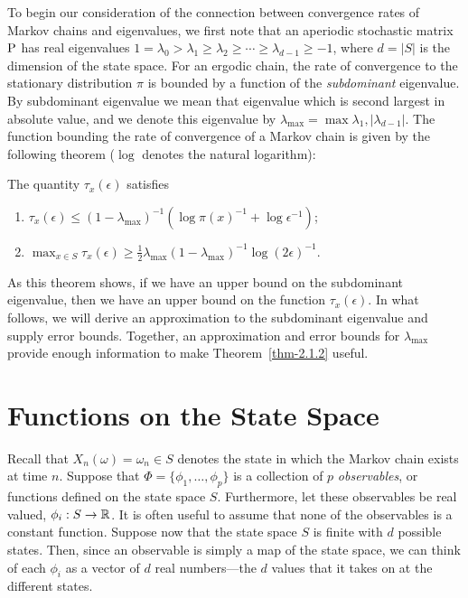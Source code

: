 To begin our consideration of the connection between convergence rates of Markov
chains and eigenvalues, we first note that an aperiodic stochastic matrix $\P$ has real
eigenvalues 
$1 = \lambda_0 > \lambda_1 \geq \lambda_2 \geq \cdots \geq \lambda_{d-1} \geq -1$, 
where $d = |S|$ is the dimension of the state space. For an ergodic chain, the
rate of convergence to the stationary distribution $\pi$ is bounded by a
function of the \emph{subdominant} eigenvalue. By subdominant eigenvalue we mean that
eigenvalue which is second largest in absolute value, and we denote this
eigenvalue by $\lambda_{\max} = \max{\lambda_1, |\lambda_{d-1}|}$. 
The function bounding the rate of convergence of a Markov chain is given by the
following theorem ($\log$ denotes the natural logarithm):
\begin{theorem}
\label{thm-2.1.2}
The quantity $\tau_x(\epsilon)$ satisfies
\begin{enumerate}
\item 
$\tau_x(\epsilon) \leq (1-\lambda_{\max})^{-1}(\log \pi(x)^{-1} + \log \epsilon^{-1})$;
\item $\max_{x \in S} \tau_x(\epsilon) \geq \frac{1}{2} \lambda_{\max}(1-\lambda_{\max})^{-1} \log(2\epsilon)^{-1}$.
\end{enumerate}
\end{theorem}
As this theorem shows, if we have an upper bound on the subdominant eigenvalue, then we have
an upper bound on the function $\tau_x(\epsilon)$. In what follows, we will
derive an approximation to the 
subdominant eigenvalue and supply error bounds. Together, an approximation and error bounds
for $\lambda_{\max}$  provide enough information to make Theorem~\ref{thm-2.1.2} useful.

\section{Functions on the State Space}
\label{sec:funct-state-space}
Recall that $X_n(\omega) = \omega_n\in S$ denotes the state in which the Markov
chain exists at time $n$. 
Suppose that 
$\Phi = \{\phi_1, \dots, \phi_p\}$ 
is a collection of $p$ \emph{observables}, or functions defined on the state
space $S$. Furthermore, let these observables be real valued, 
$\phi_i : S \rightarrow \R$. 
It is often useful to assume that none of the observables is a constant function. Suppose now that
the state space $S$ is finite with $d$ possible states. Then, since an
observable is simply a map of the state space, we can think of each $\phi_i$ as a
vector of $d$ real numbers---the $d$ values that it takes on at the different states.

